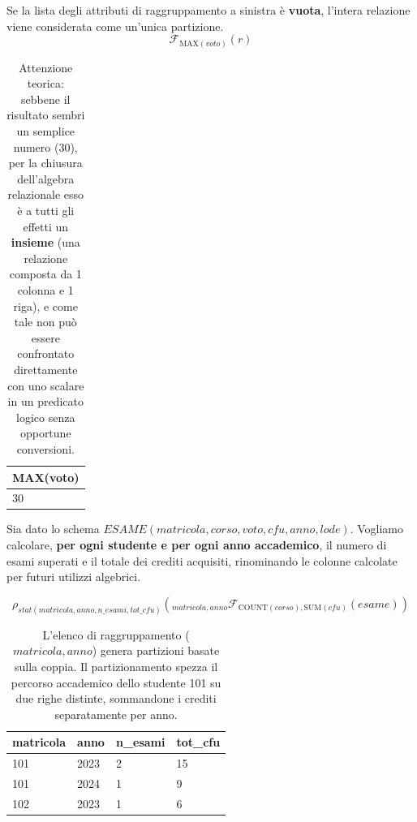 \begin{example}
    Se la lista degli attributi di raggruppamento a sinistra è \textbf{vuota}, l'intera relazione viene considerata come un'unica partizione.
    $$ \mathcal{F}_{\text{MAX}(voto)}(r) $$

    \begin{table}[H]
        \centering
        \renewcommand{\arraystretch}{1.2}
        \begin{tabular}{l}
            \toprule
            \textbf{MAX(voto)} \\
            \midrule
            30 \\
            \bottomrule
        \end{tabular}
        \caption{Attenzione teorica: sebbene il risultato sembri un semplice numero (30), per la chiusura dell'algebra relazionale esso è a tutti gli effetti un \textbf{insieme} (una relazione composta da 1 colonna e 1 riga), e come tale non può essere confrontato direttamente con uno scalare in un predicato logico senza opportune conversioni.}
    \end{table}
\end{example}

\begin{example}
    Sia dato lo schema $ESAME(matricola, corso, voto, cfu, anno, lode)$. Vogliamo calcolare, \textbf{per ogni studente e per ogni anno accademico}, il numero di esami superati e il totale dei crediti acquisiti, rinominando le colonne calcolate per futuri utilizzi algebrici.
    
    $$ \rho_{stat(matricola, anno, n\_esami, tot\_cfu)}({}_{matricola, anno} \mathcal{F}_{\text{COUNT}(corso), \text{SUM}(cfu)}(esame)) $$

    \begin{table}[H]
        \centering
        \renewcommand{\arraystretch}{1.2}
        \begin{tabular}{llll}
            \toprule
            \textbf{matricola} & \textbf{anno} & \textbf{n\_esami} & \textbf{tot\_cfu} \\
            \midrule
            101 & 2023 & 2 & 15 \\
            101 & 2024 & 1 & 9 \\
            102 & 2023 & 1 & 6 \\
            \bottomrule
        \end{tabular}
        \caption{L'elenco di raggruppamento ($matricola, anno$) genera partizioni basate sulla coppia. Il partizionamento spezza il percorso accademico dello studente 101 su due righe distinte, sommandone i crediti separatamente per anno.}
    \end{table}
\end{example}

